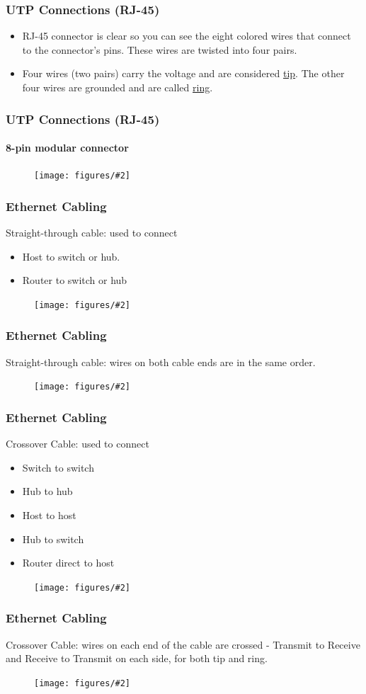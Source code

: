 \documentclass{beamer}
\newcommand{\fig}[2]{
\begin{center}
\begin{figure}
\texttt{[image: figures/\#2]}
\end{figure}
\end{center}
}
\begin{document}
\begin{frame}
\frametitle{\huge UTP Connections (RJ-45)} 
 \begin{itemize} 
\Large
\item <1-> RJ-45 connector is clear so you can see the eight colored wires that connect to the connector's pins. These wires are twisted into four pairs. 
\item <2-> Four wires (two pairs) carry the voltage and are considered \underline{tip}. The other four wires are grounded and are called \underline{ring}.   
\end{itemize}
\end{frame}


\begin{frame}
\frametitle{\huge UTP Connections (RJ-45)}   
\framesubtitle{8-pin modular connector}
\fig{0.5}{network_utp}
\end{frame}


\begin{frame}
\frametitle{\huge Ethernet Cabling} 
\Large
Straight-through cable: used to connect
 \begin{itemize} 
\item <1-> Host to switch or hub. 
\item <2-> Router to switch or hub
\end{itemize}
\fig{0.6}{network_straight}
\end{frame}

\begin{frame}
\frametitle{\huge Ethernet Cabling} 
\Large
Straight-through cable: wires on both cable ends are in the same order.  
 
\fig{0.6}{network_straight2}
\end{frame}

\begin{frame}
\frametitle{\huge Ethernet Cabling} 
\Large
Crossover Cable: used to connect
 \begin{itemize} 
\item <1-> Switch to switch 
\item <2-> Hub to hub
\item <3-> Host to host
\item <4-> Hub to switch 
\item <5-> Router direct to host
\end{itemize}
\fig{0.6}{network_cross}
\end{frame}

\begin{frame}
\frametitle{\huge Ethernet Cabling} 
\Large
Crossover Cable: wires on each end of the cable are crossed - Transmit to Receive and Receive to Transmit on each side, for both tip and ring.  
\fig{0.55}{network_cross2}
\end{frame}
\end{document}
